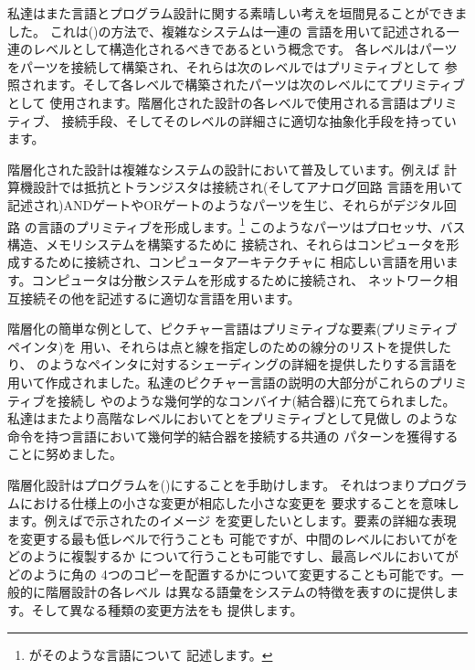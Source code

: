 私達はまた言語とプログラム設計に関する素晴しい考えを垣間見ることができました。
これは()の方法で、複雑なシステムは一連の
言語を用いて記述される一連のレベルとして構造化されるべきであるという概念です。
各レベルはパーツをパーツを接続して構築され、それらは次のレベルではプリミティブとして
参照されます。そして各レベルで構築されたパーツは次のレベルにてプリミティブとして
使用されます。階層化された設計の各レベルで使用される言語はプリミティブ、
接続手段、そしてそのレベルの詳細さに適切な抽象化手段を持っています。



階層化された設計は複雑なシステムの設計において普及しています。例えば
計算機設計では抵抗とトランジスタは接続され(そしてアナログ回路
言語を用いて記述され)ANDゲートやORゲートのようなパーツを生じ、それらがデジタル回路
の言語のプリミティブを形成します。\footnote{がそのような言語について
記述します。} このようなパーツはプロセッサ、バス構造、メモリシステムを構築するために
接続され、それらはコンピュータを形成するために接続され、コンピュータアーキテクチャに
相応しい言語を用います。コンピュータは分散システムを形成するために接続され、
ネットワーク相互接続その他を記述するに適切な言語を用います。


階層化の簡単な例として、ピクチャー言語はプリミティブな要素(プリミティブペインタ)を
用い、それらは点と線を指定しのための線分のリストを提供したり、
のようなペインタに対するシェーディングの詳細を提供したりする言語を
用いて作成されました。私達のピクチャー言語の説明の大部分がこれらのプリミティブを接続し
やのような幾何学的なコンバイナ(結合器)に充てられました。
私達はまたより高階なレベルにおいてとをプリミティブとして見做し
のような命令を持つ言語において幾何学的結合器を接続する共通の
パターンを獲得することに努めました。



階層化設計はプログラムを()にすることを手助けします。
それはつまりプログラムにおける仕様上の小さな変更が相応した小さな変更を
要求することを意味します。例えばで示されたのイメージ
を変更したいとします。要素の詳細な表現を変更する最も低レベルで行うことも
可能ですが、中間のレベルにおいてがをどのように複製するか
について行うことも可能ですし、最高レベルにおいてがどのように角の
4つのコピーを配置するかについて変更することも可能です。一般的に階層設計の各レベル
は異なる語彙をシステムの特徴を表すのに提供します。そして異なる種類の変更方法をも
提供します。

